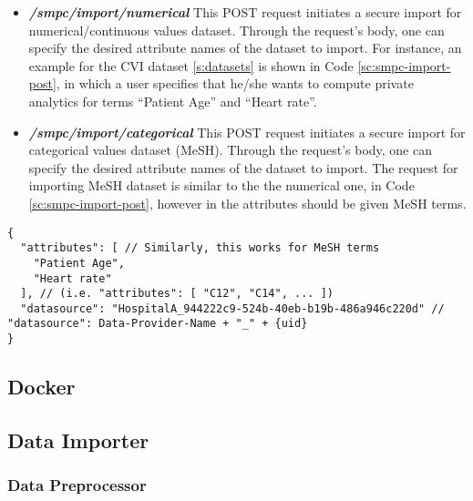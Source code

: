 \begin{itemize}
\item \textbf{\textit{/smpc/import/numerical}}
This POST request initiates a secure import for numerical/continuous values dataset.
Through the request's body, one can specify the desired attribute names of the dataset to import.
For instance, an example for the CVI dataset \ref{s:datasets} is shown in Code \ref{sc:smpc-import-post}, in which a user specifies that he/she wants to compute private analytics for terms ``Patient Age'' and ``Heart rate''.

\item \textbf{\textit{/smpc/import/categorical}}
This POST request initiates a secure import for categorical values dataset (MeSH).
Through the request's body, one can specify the desired attribute names of the dataset to import.
The request for importing MeSH dataset is similar to the the numerical one, in Code \ref{sc:smpc-import-post}, however in the attributes should be given MeSH terms.

\end{itemize}

{
\begin{verbatim}
{
  "attributes": [ // Similarly, this works for MeSH terms
    "Patient Age",
    "Heart rate"
  ], // (i.e. "attributes": [ "C12", "C14", ... ])
  "datasource": "HospitalA_944222c9-524b-40eb-b19b-486a946c220d" // "datasource": Data-Provider-Name + "_" + {uid}
}
\end{verbatim}
\label{sc:smpc-import-post}
}


\subsection{Docker}\label{ss:data-providers-docker}


\subsection{Data Importer}\label{ss:data-providers-importer}


\subsubsection{Data Preprocessor}\label{sss:data-providers-preprocessor}



